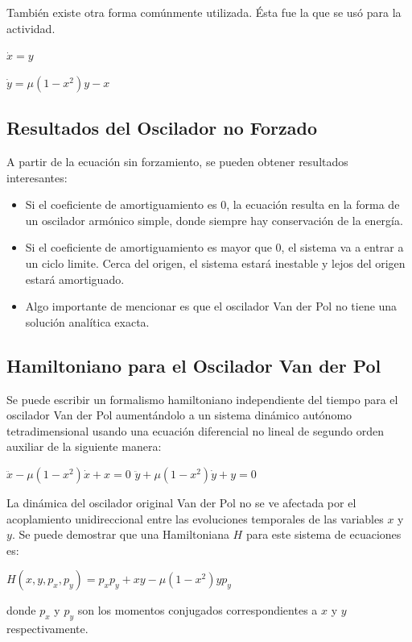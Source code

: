 \documentclass[a4paper]{article}
\begin{document}
También existe otra forma comúnmente utilizada. Ésta fue la que se usó para la actividad. 
\begin{center}
$\dot{x} = y$

$\dot{y} = \mu(1 - x^2)y - x$
\end{center}

\subsection{Resultados del Oscilador no Forzado}
A partir de la ecuación sin forzamiento, se pueden obtener resultados interesantes:
\begin{itemize}
\item Si el coeficiente de amortiguamiento es 0, la ecuación resulta en la forma de un oscilador armónico simple, donde siempre hay conservación de la energía.
\item Si el coeficiente de amortiguamiento es mayor que 0, el sistema va a entrar a un ciclo limite. Cerca del origen, el sistema estará inestable y lejos del origen estará amortiguado. 
\item Algo importante de mencionar es que el oscilador Van der Pol no tiene una solución analítica exacta. 
\end{itemize}

\subsection{Hamiltoniano para el Oscilador Van der Pol}
Se puede escribir un formalismo hamiltoniano independiente del tiempo para el oscilador Van der Pol aumentándolo a un sistema dinámico autónomo tetradimensional usando una ecuación diferencial no lineal de segundo orden auxiliar de la siguiente manera:
\begin{center}
$\ddot{x} - \mu(1 - x^2)\dot{x} + x = 0$
$\ddot{y} + \mu(1 - x^2)\dot{y} +y = 0$
\end{center}

La dinámica del oscilador original Van der Pol no se ve afectada por el acoplamiento unidireccional entre las evoluciones temporales de las variables $x$ y $y$. Se puede demostrar que una Hamiltoniana $H$ para este sistema de ecuaciones es:

\begin{center}
$H(x,y,p_x,p_y) = p_xp_y + xy - \mu(1 - x^2)yp_y$
\end{center}

donde $p_x$ y $p_y$ son los momentos conjugados correspondientes a $x$ y $y$ respectivamente.
\end{document}
